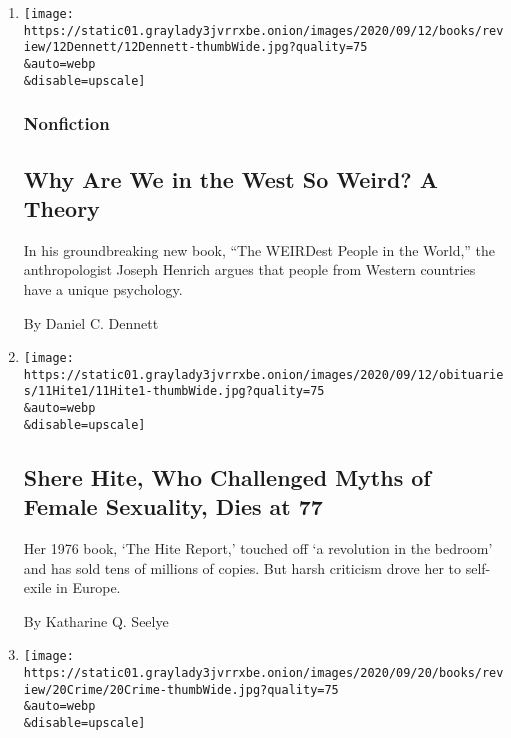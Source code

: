 \begin{enumerate}
\def\labelenumi{\arabic{enumi}.}
\item
  \href{/2020/09/12/books/review/the-weirdest-people-in-the-world-joseph-henrich.html}{}

  \texttt{[image: https://static01.graylady3jvrrxbe.onion/images/2020/09/12/books/review/12Dennett/12Dennett-thumbWide.jpg?quality=75\\\&auto=webp\\\&disable=upscale]}

  \hypertarget{nonfiction}{%
  \subsubsection{Nonfiction}\label{nonfiction}}

  \hypertarget{why-are-we-in-the-west-so-weird-a-theory}{%
  \subsection{Why Are We in the West So Weird? A
  Theory}\label{why-are-we-in-the-west-so-weird-a-theory}}

  In his groundbreaking new book, ``The WEIRDest People in the World,''
  the anthropologist Joseph Henrich argues that people from Western
  countries have a unique psychology.

  By Daniel C. Dennett
\item
  \href{/2020/09/11/books/shere-hite-dead.html}{}

  \texttt{[image: https://static01.graylady3jvrrxbe.onion/images/2020/09/12/obituaries/11Hite1/11Hite1-thumbWide.jpg?quality=75\\\&auto=webp\\\&disable=upscale]}

  \hypertarget{shere-hite-who-challenged-myths-of-female-sexuality-dies-at-77}{%
  \subsection{Shere Hite, Who Challenged Myths of Female Sexuality, Dies
  at
  77}\label{shere-hite-who-challenged-myths-of-female-sexuality-dies-at-77}}

  Her 1976 book, `The Hite Report,' touched off `a revolution in the
  bedroom' and has sold tens of millions of copies. But harsh criticism
  drove her to self-exile in Europe.

  By Katharine Q. Seelye
\item
  \href{/2020/09/11/books/review/crime-fiction-ruth-ware-peter-lovesey.html}{}

  \texttt{[image: https://static01.graylady3jvrrxbe.onion/images/2020/09/20/books/review/20Crime/20Crime-thumbWide.jpg?quality=75\\\&auto=webp\\\&disable=upscale]}


\end{enumerate}
